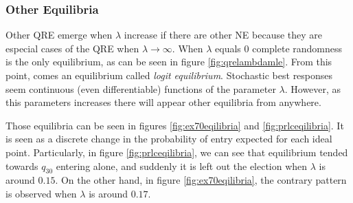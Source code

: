\subsubsection{Other Equilibria}

Other QRE emerge when $\lambda$ increase if there are other NE because they are especial cases of the QRE when $\lambda\rightarrow\infty$.
When $\lambda$ equals $0$ complete randomness is the only equilibrium, as can be seen in figure \ref{fig:qrelambdamle}. From this point, comes an equilibrium called \emph{logit equilibrium}\cite{Goeree2016}. 
Stochastic best responses seem continuous (even differentiable) functions of the parameter $\lambda$. However, as this parameters increases there will appear other equilibria from anywhere. 

Those equilibria can be seen in figures \ref{fig:ex70eqilibria} and \ref{fig:prlceqilibria}. It is seen as a discrete change in the probability of entry expected for each ideal point. Particularly, in figure \ref{fig:prlceqilibria}, we can see that equilibrium tended towards $q_{30}$ entering alone, and suddenly it is left out the election when $\lambda$ is around $0.15$. On the other hand, in figure \ref{fig:ex70eqilibria}, the contrary pattern is observed when $\lambda$ is around $0.17$.

